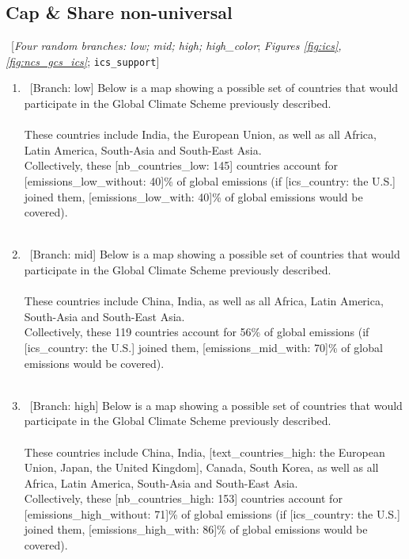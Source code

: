  \subsection*{Cap \& Share non-universal} 
 ~[\textit{Four random branches: low; mid; high; high\_color}; \textit{Figures \ref{fig:ics}, \ref{fig:ncs_gcs_ics}}; 
 \verb|ics_support|] 
 \begin{enumerate}[resume] 
\item ~[Branch: low]  \label{q:gcs_low} Below is a map showing a possible set of countries that would participate in the Global Climate Scheme previously described.\\
~\\
These countries include India, the European Union, as well as all Africa, Latin America, South-Asia and South-East Asia.\\
Collectively, these [nb\_countries\_low: 145] countries account for [emissions\_low\_without: 40]\% of global emissions (if [ics\_country: the U.S.] joined them, [emissions\_low\_with: 40]\% of global emissions would be covered).\\
~\\ 

\item ~[Branch: mid] \label{q:gcs_mid} Below is a map showing a possible set of countries that would participate in the Global Climate Scheme previously described.\\
~\\
These countries include China, India, as well as all Africa, Latin America, South-Asia and South-East Asia.\\
Collectively, these 119 countries account for 56\% of global emissions (if [ics\_country: the U.S.] joined them, [emissions\_mid\_with: 70]\% of global emissions would be covered).\\
~\\ 

\item ~[Branch: high]  \label{q:gcs_high} Below is a map showing a possible set of countries that would participate in the Global Climate Scheme previously described.\\
~\\
These countries include China, India, [text\_countries\_high: the European Union, Japan, the United Kingdom], Canada, South Korea, as well as all Africa, Latin America, South-Asia and South-East Asia.~\\
Collectively, these [nb\_countries\_high: 153] countries account for [emissions\_high\_without: 71]\% of global emissions (if [ics\_country: the U.S.] joined them, [emissions\_high\_with: 86]\% of global emissions would be covered).\\
~\\ 


\end{enumerate}
